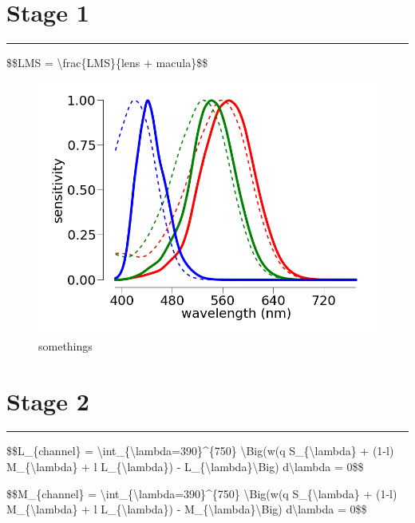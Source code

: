 \section{Stage 1}

\begin{center}\rule{3in}{0.4pt}\end{center}

\$\$LMS = \textbackslash{}frac\{LMS\}\{lens + macula\}\$\$

\begin{figure}[htbp]
\centering
\includegraphics{../presentations/static/figures/colorModel/fundamentals.png}
\caption{somethings}
\end{figure}

\section{Stage 2}

\begin{center}\rule{3in}{0.4pt}\end{center}

\$\$L\_\{channel\} =
\textbackslash{}int\_\{\textbackslash{}lambda=390\}\^{}\{750\}
\textbackslash{}Big(w(q S\_\{\textbackslash{}lambda\} + (1-l)
M\_\{\textbackslash{}lambda\} + l L\_\{\textbackslash{}lambda\}) -
L\_\{\textbackslash{}lambda\}\textbackslash{}Big)
d\textbackslash{}lambda = 0\$\$

\$\$M\_\{channel\} =
\textbackslash{}int\_\{\textbackslash{}lambda=390\}\^{}\{750\}
\textbackslash{}Big(w(q S\_\{\textbackslash{}lambda\} + (1-l)
M\_\{\textbackslash{}lambda\} + l L\_\{\textbackslash{}lambda\}) -
M\_\{\textbackslash{}lambda\}\textbackslash{}Big)
d\textbackslash{}lambda = 0\$\$

